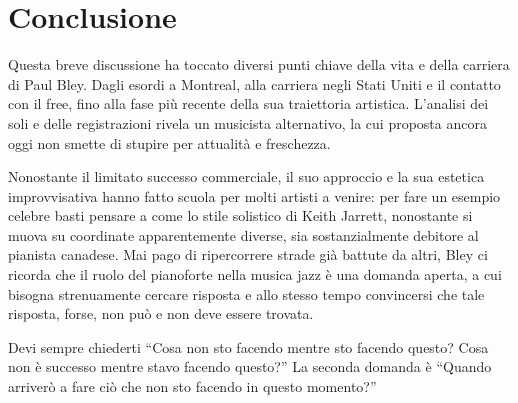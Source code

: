 \chapter*{Conclusione}
Questa breve discussione ha toccato diversi punti chiave della vita e della carriera di Paul Bley. Dagli esordi a Montreal, alla carriera negli Stati Uniti e il contatto con il free, fino alla fase più recente della sua traiettoria artistica. L'analisi dei soli e delle registrazioni rivela un musicista alternativo, la cui proposta ancora oggi non smette di stupire per attualità e freschezza.\par
Nonostante il limitato successo commerciale, il suo approccio e la sua estetica improvvisativa hanno fatto scuola per molti artisti a venire: per fare un esempio celebre basti pensare a come lo stile solistico di Keith Jarrett, nonostante si muova su coordinate apparentemente diverse, sia sostanzialmente debitore al pianista canadese. Mai pago di ripercorrere strade già battute da altri, Bley ci ricorda che il ruolo del pianoforte nella musica jazz è una domanda aperta, a cui bisogna strenuamente cercare risposta e allo stesso tempo convincersi che tale risposta, forse, non può e non deve essere trovata. 
\begin{fquote}
	Devi sempre chiederti ``Cosa non sto facendo mentre sto facendo questo? Cosa non è successo mentre stavo facendo questo?'' La seconda domanda è ``Quando arriverò a fare ciò che non sto facendo in questo momento?''
\end{fquote}
